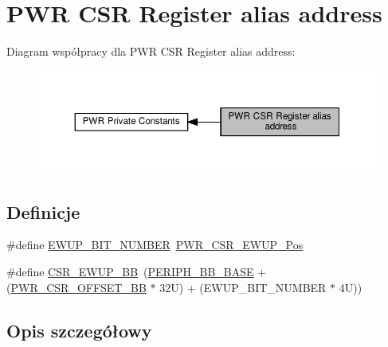 \hypertarget{group___p_w_r___c_s_r__register__alias}{}\section{P\+WR C\+SR Register alias address}
\label{group___p_w_r___c_s_r__register__alias}
Diagram współpracy dla P\+WR C\+SR Register alias address\+:\nopagebreak
\begin{figure}[H]
\begin{center}
\leavevmode
\includegraphics[width=350pt]{group___p_w_r___c_s_r__register__alias}
\end{center}
\end{figure}
\subsection*{Definicje}
\begin{DoxyCompactItemize}
\item 
\#define \hyperlink{group___p_w_r___c_s_r__register__alias_gae006999c3cf61de12915df07eadb50f9}{E\+W\+U\+P\+\_\+\+B\+I\+T\+\_\+\+N\+U\+M\+B\+ER}~\hyperlink{group___peripheral___registers___bits___definition_ga20d629ea754e9d5942a97e037d515816}{P\+W\+R\+\_\+\+C\+S\+R\+\_\+\+E\+W\+U\+P\+\_\+\+Pos}
\item 
\#define \hyperlink{group___p_w_r___c_s_r__register__alias_gaaff864595f697850b19173b0bca991b0}{C\+S\+R\+\_\+\+E\+W\+U\+P\+\_\+\+BB}~(\hyperlink{group___peripheral__memory__map_gaed7efc100877000845c236ccdc9e144a}{P\+E\+R\+I\+P\+H\+\_\+\+B\+B\+\_\+\+B\+A\+SE} + (\hyperlink{group___p_w_r__register__alias__address_gaa9477acfcacc4610533df164c94ad6fd}{P\+W\+R\+\_\+\+C\+S\+R\+\_\+\+O\+F\+F\+S\+E\+T\+\_\+\+BB} $\ast$ 32\+U) + (\+E\+W\+U\+P\+\_\+\+B\+I\+T\+\_\+\+N\+U\+M\+B\+E\+R $\ast$ 4\+U))
\end{DoxyCompactItemize}


\subsection{Opis szczegółowy}


